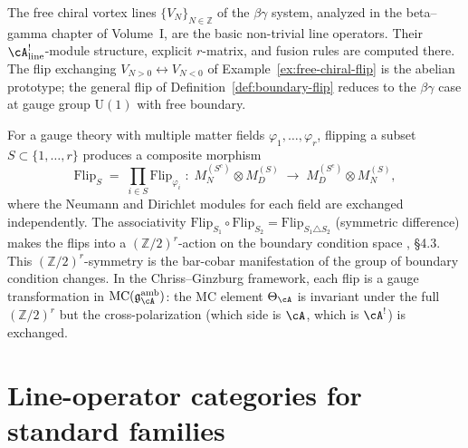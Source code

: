 \begin{remark}
\label{rem:vortex-line-prototype}
The free chiral vortex lines $\{V_N\}_{N \in \mathbb{Z}}$ of the
$\beta\gamma$ system, analyzed in the beta--gamma chapter of
Volume~I, are the basic non-trivial line operators. Their
$\cA^!_{\mathrm{line}}$-module structure, explicit $r$-matrix, and
fusion rules are computed there. The flip exchanging
$V_{N>0} \leftrightarrow V_{N<0}$ of
Example~\ref{ex:free-chiral-flip} is the abelian prototype; the
general flip of Definition~\ref{def:boundary-flip} reduces to the
$\beta\gamma$ case at gauge group $\mathrm{U}(1)$ with free
boundary.
\end{remark}

\begin{example}
\label{ex:composite-flips}
For a gauge theory with multiple matter fields $\varphi_1, \ldots,
\varphi_r$, flipping a subset $S \subset \{1,\ldots,r\}$ produces a
composite morphism
\begin{equation}\label{eq:composite-flip}
 \mathrm{Flip}_S
 \;=\;
 \prod_{i \in S} \mathrm{Flip}_{\varphi_i}
 \;:\;
 M_{N}^{(S^c)} \otimes M_{D}^{(S)}
 \;\longrightarrow\;
 M_{D}^{(S^c)} \otimes M_{N}^{(S)},
\end{equation}
where the Neumann and Dirichlet modules for each field are exchanged
independently. The associativity
$\mathrm{Flip}_{S_1} \circ \mathrm{Flip}_{S_2} =
\mathrm{Flip}_{S_1 \triangle S_2}$ (symmetric difference) makes the
flips into a $(\mathbb{Z}/2)^r$-action on the boundary condition
space \cite{CDG2023}, \S4.3. This $(\mathbb{Z}/2)^r$-symmetry is
the bar-cobar manifestation of the group of boundary condition
changes. In the Chriss--Ginzburg framework, each flip is a
gauge transformation in $\operatorname{MC}(\mathfrak{g}^{\mathrm{amb}}_{\cA})$:
the MC element $\Theta_{\cA}$ is invariant under the full
$(\mathbb{Z}/2)^r$ but the cross-polarization
(which side is $\cA$, which is $\cA^!$) is exchanged.
\end{example}


\section{Line-operator categories for standard families}
\label{sec:line-operator-standard-families}

